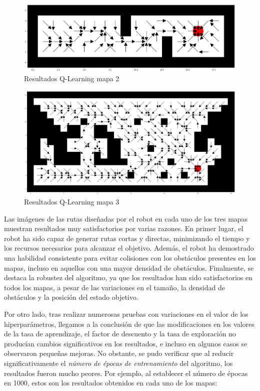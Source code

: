 \documentclass[conference,a4paper]{IEEEtran}
\begin{document}
\begin{figure}[h]
  \centering
  \includegraphics[scale=0.38]{resultado_qlearning_mapa_2}
  \caption{Resultados Q-Learning mapa 2}
  \label{fig:resultado_qlearning_mapa_2}
\end{figure}

\begin{figure}[h]
  \centering
  \includegraphics[scale=0.38]{resultado_qlearning_mapa_3}
  \caption{Resultados Q-Learning mapa 3}
  \label{fig:resultado_qlearning_mapa_3}
\end{figure}

Las imágenes de las rutas diseñadas por el robot en cada uno de los tres mapas muestran resultados muy satisfactorios por varias razones.
En primer lugar, el robot ha sido capaz de generar rutas cortas y directas, minimizando el tiempo y los recursos necesarios para alcanzar el objetivo.
Además, el robot ha demostrado una habilidad consistente para evitar colisiones con los obstáculos presentes en los mapas, incluso en aquellos con una mayor densidad de obstáculos. Finalmente, se destaca la robustez del algoritmo, 
ya que los resultados han sido satisfactorios en todos los mapas, a pesar de las variaciones en el tamaño, la densidad de obstáculos y la posición del estado objetivo.\newline

Por otro lado, tras realizar numerosas pruebas con variaciones en el valor de los hiperparámetros, llegamos a la conclusión de que las modificaciones en los valores de la tasa de aprendizaje, el factor de descuento y la tasa de exploración no producían cambios significativos en los resultados,
e incluso en algunos casos se observaron pequeñas mejoras. No obstante, se pudo verificar que al reducir significativamente el \textit{número de épocas de entrenamiento} 
del algoritmo, los resultados fueron mucho peores. Por ejemplo, al establecer el número de épocas en 1000,
estos son los resultados obtenidos en cada uno de los mapas:
\end{document}
